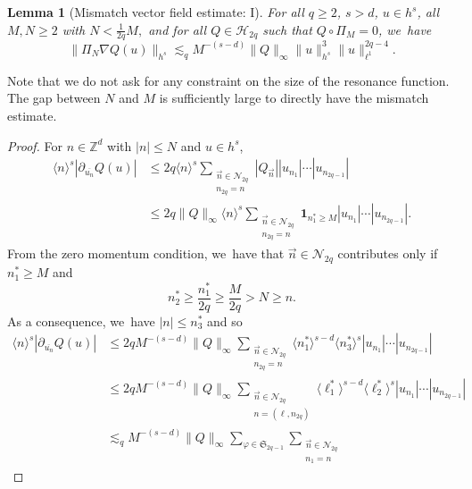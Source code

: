 \documentclass[10pt,a4paper]{amsart}
\theoremstyle{plain}
\newtheorem{lemma}[theorem]{Lemma}
\theoremstyle{definition}
\newcommand{\1}{\mathbf{1}}
\begin{document}
\begin{lemma}[Mismatch vector field estimate: I]\label{lem:misI}
For all $q\geq 2$, $s>d$, $u\in h^s$, all $M,N\geq 2$ with
$N<\frac{1}{2q}M, $
and for all $Q\in\mathcal{H}_{2q}$ such that $Q\circ \Pi_M = 0$, we~have
\begin{equation*}
\|\Pi_{N} \nabla Q(u)\|_{h^{s}} \lesssim_{q} M^{-(s-d)}
\|Q\|_{\infty}
\|u\|_{h^{s}}^{3}\|u\|_{\ell^{1}}^{2q-4}.
\end{equation*}
\end{lemma}
Note that we do not ask for any constraint on the size of the resonance function. The gap between $N$ and $M$ is sufficiently large to directly have the mismatch estimate.
\begin{proof}
For $n\in \mathbb{Z}^d$ with $|n|\leq N$ and $u\in h^{s}$,
\begin{equation*}
\begin{split}
\langle n\rangle^{s}| \partial_{\overline{u_n}} Q(u)|& \leq 2q \langle n\rangle^{s}
\sum_{\substack{\vec{n}\in\mathcal{N}_{2q}\\ n_{2q}=n}} |Q_{\vec{n}}||u_{n_{1}}|\cdots|u_{n_{2q-1}}| \\
&\leq 2q\|Q\|_{\infty} \langle n\rangle^{s}\sum_{\substack{\vec{n}\in\mathcal{N}_{2q}\\n_{2q}=n}} \mathbf{1}_{n_{1}^{\ast}\geq M}|u_{n_{1}}|\cdots|u_{n_{2q-1}}|.
\end{split}
\end{equation*}
From the zero momentum condition, we~have that $\vec{n}\in\mathcal{N}_{2q}$ contributes only if $n_{1}^{\ast}\geq M$ and
\[
n_{2}^{\ast}\geq \frac{n_{1}^{\ast}}{2q} \geq \frac{M}{2q} > N \geq n.
\]
As a consequence, we~have $|n|\leq n_{3}^{\ast}$ and so
\begin{equation*}
\begin{split}
\langle n\rangle^{s}|\partial_{\overline{u_n}} Q(u)| &\leq 2q M^{-(s-d)} \|Q\|_{\infty}
\sum_{\substack{\vec{n}\in\mathcal{N}_{2q}\\n_{2q}=n}}
\langle n_{1}^{\ast}\rangle^{s-d} \langle n_{3}^{\ast}\rangle^{s}
|u_{n_{1}}|\cdots|u_{n_{2q-1}}|\\
&\leq 2q M^{-(s-d)} \|Q\|_{\infty}
\sum_{\substack{\vec{n}\in\mathcal{N}_{2q} \\ n=(\ell,n_{2q})}}
\langle \ell_{1}^{\ast}\rangle^{s-d} \langle \ell_{2}^{\ast}\rangle^{s}
|u_{n_{1}}|\cdots|u_{n_{2q-1}}|\\
&\lesssim_q M^{-(s-d)} \|Q\|_{\infty}
\sum_{\varphi \in \mathfrak{S}_{2q-1}}\sum_{\substack{\vec{n}\in\mathcal{N}_{2q}\\n_{1}=n}}

\end{split}
\end{equation*}
\end{proof}
\end{document}
